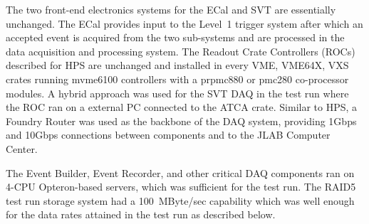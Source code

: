 The two front-end electronics systems for the ECal and SVT are essentially unchanged. The ECal provides 
input to the Level~1 trigger system after which an accepted event is acquired from the two sub-systems 
and are processed in the data acquisition and processing system. The Readout Crate Controllers (ROCs)
 described for HPS are unchanged and installed in every VME, VME64X, VXS crates running 
 mvme6100 controllers with a prpmc880 or pmc280 co-processor modules. A hybrid approach was 
 used for the SVT DAQ in the test run where the ROC ran on a external PC connected to the ATCA crate. 
 Similar to HPS, a Foundry Router was used as the backbone of the DAQ system, providing 1Gbps and 
 10Gbps connections between components and to the JLAB Computer Center.

The Event Builder, Event Recorder, and other critical DAQ components ran on 
4-CPU Opteron-based servers, which was sufficient for the test run. The RAID5 test run storage system 
had a 100~MByte/sec capability which was well enough for the data rates attained in the test run as 
described below. 






